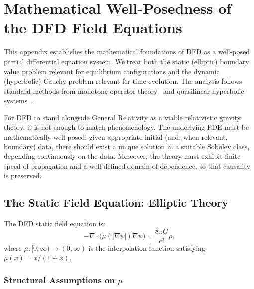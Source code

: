 
\section{Mathematical Well-Posedness of the DFD Field Equations}\label{app:wellposedness}

This appendix establishes the mathematical foundations of DFD as a well-posed 
partial differential equation system. We treat both the static (elliptic) 
boundary value problem relevant for equilibrium configurations and the 
dynamic (hyperbolic) Cauchy problem relevant for time evolution. The analysis 
follows standard methods from monotone operator theory~\cite{Brezis,Evans} and 
quasilinear hyperbolic systems~\cite{GilbargTrudinger,LadyzhenskayaUraltseva}.

For DFD to stand alongside General Relativity as a viable relativistic gravity 
theory, it is not enough to match phenomenology. The underlying PDE must be 
mathematically well posed: given appropriate initial (and, when relevant, 
boundary) data, there should exist a unique solution in a suitable Sobolev 
class, depending continuously on the data. Moreover, the theory must exhibit 
finite speed of propagation and a well-defined domain of dependence, so that 
causality is preserved.

\subsection{The Static Field Equation: Elliptic Theory}\label{app:well-static}

The DFD static field equation is:
\begin{equation}\label{eq:static-pde-U}
-\nabla \cdot \bigl( \mu(|\nabla\psi|)\nabla\psi \bigr) = \frac{8\pi G}{c^2}\rho,
\end{equation}
where $\mu:[0,\infty) \to (0,\infty)$ is the interpolation function satisfying 
$\mu(x) = x/(1+x)$.

\subsubsection{Structural Assumptions on $\mu$}

